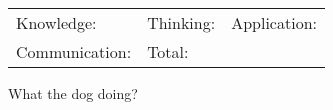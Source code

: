 \documentclass[10pt,letter,addpoints]{exam}
\begin{document}
\begin{tabularx}{\textwidth}{@{}XXX@{}}
    Knowledge: & Thinking: & Application: \\ Communication: & Total: 
\end{tabularx}

\begin{questions}
    \question[10] What the dog doing?
\end{questions}
\end{document}
